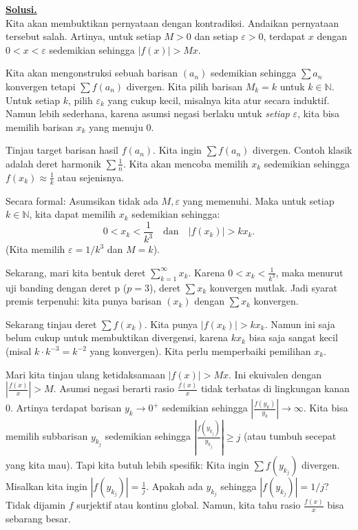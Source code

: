 \documentclass[12pt,twoside]{article}
\newenvironment{solution}
{
	\par\noindent\textbf{\underline{Solusi.}}\\
}
{
	\par
}
\begin{document}
\begin{enumerate}
\begin{solution}
          Kita akan membuktikan pernyataan dengan kontradiksi.
          Andaikan pernyataan tersebut salah.
          Artinya, untuk setiap $M > 0$ dan setiap $\varepsilon > 0$, terdapat $x$ dengan $0 < x < \varepsilon$ sedemikian sehingga $|f(x)| > Mx$.

          Kita akan mengonstruksi sebuah barisan $(a_n)$ sedemikian sehingga $\sum a_n$ konvergen tetapi $\sum f(a_n)$ divergen.
          Kita pilih barisan $M_k = k$ untuk $k \in \mathbb{N}$.
          Untuk setiap $k$, pilih $\varepsilon_k$ yang cukup kecil, misalnya kita atur secara induktif.
          Namun lebih sederhana, karena asumsi negasi berlaku untuk \textit{setiap} $\varepsilon$, kita bisa memilih barisan $x_k$ yang menuju 0.

          Tinjau target barisan hasil $f(a_n)$. Kita ingin $\sum f(a_n)$ divergen. Contoh klasik adalah deret harmonik $\sum \frac{1}{n}$.
          Kita akan mencoba memilih $x_k$ sedemikian sehingga $f(x_k) \approx \frac{1}{k}$ atau sejenisnya.

          Secara formal:
          Asumsikan tidak ada $M, \varepsilon$ yang memenuhi.
          Maka untuk setiap $k \in \mathbb{N}$, kita dapat memilih $x_k$ sedemikian sehingga:
          \[ 0 < x_k < \frac{1}{k^3} \quad \text{dan} \quad |f(x_k)| > k x_k. \]
          (Kita memilih $\varepsilon = 1/k^3$ dan $M=k$).

          Sekarang, mari kita bentuk deret $\sum_{k=1}^\infty x_k$.
          Karena $0 < x_k < \frac{1}{k^3}$, maka menurut uji banding dengan deret p ($p=3$), deret $\sum x_k$ konvergen mutlak.
          Jadi syarat premis terpenuhi: kita punya barisan $(x_k)$ dengan $\sum x_k$ konvergen.

          Sekarang tinjau deret $\sum f(x_k)$.
          Kita punya $|f(x_k)| > k x_k$.
          Namun ini saja belum cukup untuk membuktikan divergensi, karena $k x_k$ bisa saja sangat kecil (misal $k \cdot k^{-3} = k^{-2}$ yang konvergen).
          Kita perlu memperbaiki pemilihan $x_k$.

          Mari kita tinjau ulang ketidaksamaan $|f(x)| > Mx$. Ini ekuivalen dengan $\left| \frac{f(x)}{x} \right| > M$.
          Asumsi negasi berarti rasio $\frac{f(x)}{x}$ tidak terbatas di lingkungan kanan 0.
          Artinya terdapat barisan $y_k \to 0^+$ sedemikian sehingga $\left| \frac{f(y_k)}{y_k} \right| \to \infty$.
          Kita bisa memilih subbarisan $y_{k_j}$ sedemikian sehingga $|\frac{f(y_{k_j})}{y_{k_j}}| \ge j$ (atau tumbuh secepat yang kita mau).
          Tapi kita butuh lebih spesifik: Kita ingin $\sum f(y_{k_j})$ divergen.
          Misalkan kita ingin $|f(y_{k_j})| = \frac{1}{j}$.
          Apakah ada $y_{k_j}$ sehingga $|f(y_{k_j})| = 1/j$? Tidak dijamin $f$ surjektif atau kontinu global.
          Namun, kita tahu rasio $\frac{f(x)}{x}$ bisa sebarang besar.


\end{solution}
\end{enumerate}
\end{document}
